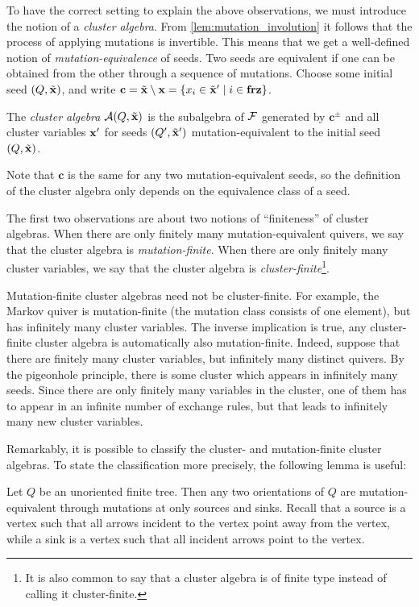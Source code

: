 To have the correct setting to explain the above observations, we must introduce the
notion of a \emph{cluster algebra}. From
\cref{lem:mutation_involution} it follows that the process of applying mutations is
invertible. This means that we get a well-defined notion of
\emph{mutation-equivalence} of seeds. Two seeds are
equivalent if one can be obtained from the other through a sequence of mutations.
Choose some initial seed $(Q, \tilde{\mathbf{x}})$, and write $\mathbf{c} = \tilde{\mathbf{x}} \setminus \mathbf{x} =
	\{x_i \in \tilde{\mathbf{x}}' \mid i \in \mathbf{frz}\}$.
\begin{definition}
	The \emph{cluster algebra} $\mathcal{A} (Q, \tilde{\mathbf{x}})$ is the subalgebra of $\mathcal{F}$ generated by
	$\mathbf{c}^\pm$ and all cluster variables $\mathbf{x}'$ for seeds $(Q', \tilde{\mathbf{x}}')$
	mutation-equivalent to the initial seed $(Q, \tilde{\mathbf{x}})$.
\end{definition}
\begin{remark}
	Note that
	$\mathbf{c}$ is the same for any two mutation-equivalent seeds, so the definition of
	the cluster algebra only depends on the equivalence class of a seed.
\end{remark}

The first two observations are about two notions of ``finiteness'' of cluster algebras.
When there are only finitely many mutation-equivalent quivers, we say that the cluster
algebra is \emph{mutation-finite}. When there are only finitely
many cluster variables, we say that the cluster algebra is
\emph{cluster-finite}\footnote{It is also common to say that a
	cluster algebra is of finite type instead of calling it cluster-finite.}.

Mutation-finite cluster algebras need not be cluster-finite. For example, the Markov
quiver is mutation-finite (the mutation class consists of one element), but has
infinitely many cluster variables. The inverse implication is true, any cluster-finite
cluster algebra is automatically also mutation-finite. Indeed, suppose that there are
finitely many cluster variables, but infinitely many distinct quivers. By the
pigeonhole principle, there is some cluster which appears in infinitely many seeds.
Since there are only finitely many variables in the cluster, one of them has to appear
in an infinite number of exchange rules, but that leads to infinitely many new cluster
variables.

Remarkably, it is possible to classify the cluster- and mutation-finite cluster
algebras. To state the classification more precisely, the following lemma is useful:
\begin{lemma}
	Let $Q$ be an unoriented finite tree. Then any two orientations of $Q$ are mutation-equivalent through mutations at only sources and sinks. Recall that a source is a vertex such that all arrows incident to the vertex point away from the vertex, while a sink is a vertex such that all incident arrows point to the vertex.
\end{lemma}


